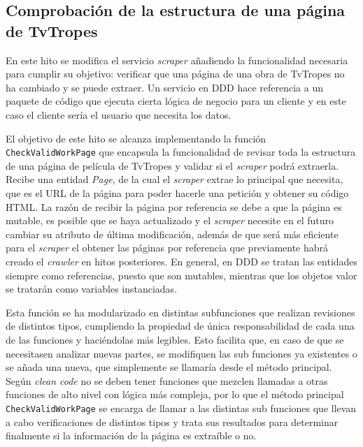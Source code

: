 \subsection{Comprobación de la estructura de una página de TvTropes}
En este hito se modifica el servicio \textit{scraper} añadiendo la funcionalidad
necesaria para cumplir su objetivo: verificar que una página de una obra de
TvTropes no ha cambiado y se puede extraer. Un servicio en DDD hace referencia a
un paquete de código que ejecuta cierta lógica de negocio para un cliente y en
este caso el cliente sería el usuario que necesita los datos. 

El objetivo de este hito se alcanza implementando la función \texttt{CheckValidWorkPage} que 
encapsula la funcionalidad de revisar toda la estructura de una página de
película de TvTropes y validar si el \textit{scraper} podrá extraerla. Recibe
una entidad \textit{Page}, de la cual el \textit{scraper} extrae lo principal
que necesita, que es el URL de la página para poder hacerle una petición y
obtener su código HTML. La razón de recibir la página por referencia se debe a
que la página es mutable, es posible que se haya actualizado y el
\textit{scraper} necesite en el futuro cambiar su atributo de última
modificación, además de que será más eficiente para el \textit{scraper} el
obtener las páginas por referencia que previamente habrá creado el
\textit{crawler} en hitos posteriores. En general, en DDD se tratan las
entidades siempre como referencias, puesto que son mutables, mientras que los
objetos valor se tratarán como variables instanciadas.

Esta función se ha modularizado en distintas subfunciones que realizan
revisiones de distintos tipos, cumpliendo la propiedad de única responsabilidad
de cada una de las funciones y haciéndolas más legibles. Esto facilita que, en
caso de que se necesitasen analizar nuevas partes, se modifiquen las sub
funciones ya existentes o se añada una nueva, que simplemente se llamaría desde
el método principal. Según \textit{clean code} no se deben tener funciones que
mezclen llamadas a otras funciones de alto nivel con lógica más compleja, por lo
que el método principal \texttt{CheckValidWorkPage} se encarga de llamar a las
distintas sub funciones que llevan a cabo verificaciones de distintos tipos y
trata sus resultados para determinar finalmente si la información de la página
es extraíble o no.

